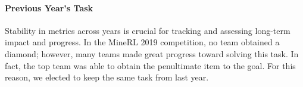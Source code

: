 \paragraph{Previous Year's Task} Stability in metrics across years is crucial for tracking and assessing long-term impact and progress. In the MineRL 2019 competition, no team obtained a diamond; however, many teams made great progress toward solving this task. In fact, the top team was able to obtain the penultimate item to the goal. For this reason, we elected to keep the same task from last year.

\newpage
